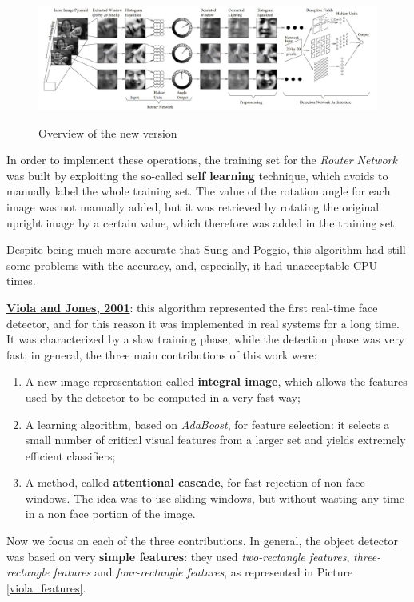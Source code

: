 \begin{figure}[h!]
		\centering
		\includegraphics[scale = 0.8]{img/rowley_overview_rotated.jpg}
        \label{rowley_rotated}
        \caption{Overview of the new version}
\end{figure}

In order to implement these operations, the training set for the \textit{Router Network} was built by exploiting the so-called \textbf{self learning} technique, which avoids to manually label the whole training set. The value of the rotation angle for each image was not manually added, but it was retrieved by rotating the original upright image by a certain value, which therefore was added in the training set. 

Despite being much more accurate that Sung and Poggio, this algorithm had still some problems with the accuracy, and, especially, it had unacceptable CPU times.

\underline{\textbf{Viola and Jones, 2001}}: this algorithm represented the first real-time face detector, and for this reason it was implemented in real systems for a long time. It was characterized by a slow training phase, while the detection phase was very fast; in general, the three main contributions of this work were:

\begin{enumerate}
    \item A new image representation called \textbf{integral image}, which allows the features used by the detector to be computed in a very fast way;
    \item A learning algorithm, based on \textit{AdaBoost}, for feature selection: it selects a small number of critical visual features from a larger set and yields extremely efficient classifiers;
    \item A method, called \textbf{attentional cascade}, for fast rejection of non face windows. The idea was to use sliding windows, but without wasting any time in a non face portion of the image.
\end{enumerate}

Now we focus on each of the three contributions. In general, the object detector was based on very \textbf{simple features}: they used \textit{two-rectangle features}, \textit{three-rectangle features} and \textit{four-rectangle features}, as represented in Picture \ref{viola_features}.

